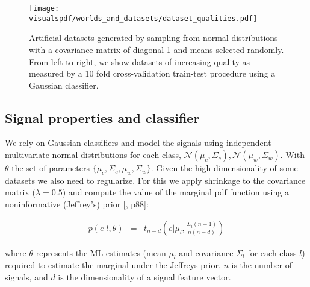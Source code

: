 \begin{figure}[!htbp]
  \centering
      \texttt{[image: \\visualspdf/worlds\_and\_datasets/dataset\_qualities.pdf]}
      \caption{Artificial datasets generated by sampling from normal distributions with a covariance matrix of diagonal 1 and means selected randomly. From left to right, we show datasets of increasing quality as measured by a 10 fold cross-validation train-test procedure using a Gaussian classifier.}
    \label{fig:datasetsquality}
\end{figure}

\subsection{Signal properties and classifier}



We rely on Gaussian classifiers and model the signals using independent multivariate normal distributions for each class, $\mathcal{N}(\mu_c, \Sigma_c), \mathcal{N}(\mu_w, \Sigma_w)$. With $\theta$ the set of parameters $\{\mu_c, \Sigma_c,\mu_w, \Sigma_w\}$. Given the high dimensionality of some datasets we also need to regularize. For this we apply shrinkage to the covariance matrix ($\lambda = 0.5$) and compute the value of the marginal pdf function using a noninformative (Jeffrey's) prior [\cite{gelman2003bayesian}, p88]:

\begin{eqnarray}
p(e|l, \theta) & = & t_{n-d}(e | \mu_l,\frac{\Sigma_l (n+1)}{n(n-d)})
\label{eq:prior}
\end{eqnarray}

where $\theta$ represents the ML estimates (mean $\mu_l$ and covariance $\Sigma_l$ for each class $l$) required to estimate the marginal under the Jeffreys prior, $n$ is the number of signals, and $d$ is the dimensionality of a signal feature vector.

